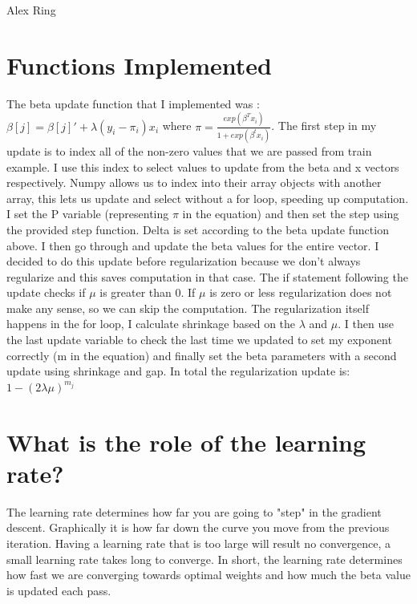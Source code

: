 \documentclass{article}
\begin{document}
 

Alex Ring
\section{Functions Implemented}
The beta update function that I implemented was : $\beta[j] = \beta[j]' + \lambda(y_i - \pi_i)x_i$ where $\pi = \frac{exp(\beta^T x_i)}{1 + exp(\beta^t x_i)}$. The first step in my update is to index all of the non-zero values that we are passed from train example. I use this index to select values to update from the beta and x vectors respectively. Numpy allows us to index into their array objects with another array, this lets us update and select without a for loop, speeding up computation. I set the P variable (representing $\pi$ in the equation) and then set the step using the provided step function. Delta is set according to the beta update function above. I then go through and update the beta values for the entire vector. I decided to do this update before regularization because we don't always regularize and this saves computation in that case. The if statement following the update checks if $\mu$ is greater than 0. If $\mu$ is zero or less regularization does not make any sense, so we can skip the computation. The regularization itself happens in the for loop, I calculate shrinkage based on the $\lambda$ and $\mu$. I then use the last update variable to check the last time we updated to set my exponent correctly (m in the equation) and finally set the beta parameters with a second update using shrinkage and gap. In total the regularization update is:  $1 - (2\lambda\mu)^{m_j}$

\section{What is the role of the learning rate?}
The learning rate determines how far you are going to "step" in the gradient descent. Graphically it is how far down the curve you move from the previous iteration. Having a learning rate that is too large will result no convergence, a small learning rate takes long to converge. In short, the learning rate determines how fast we are converging towards optimal weights and how much the beta value is updated each pass. 
\end{document}
